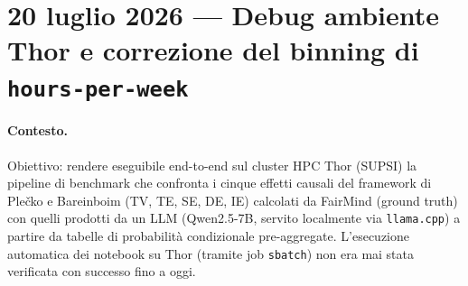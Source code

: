 \section{20 luglio 2026 --- Debug ambiente Thor e correzione del binning di \texttt{hours-per-week}}

\paragraph{Contesto.}
Obiettivo: rendere eseguibile end-to-end sul cluster HPC Thor (SUPSI) la pipeline di benchmark che confronta i cinque effetti causali del framework di Ple\v{c}ko e Bareinboim (TV, TE, SE, DE, IE) calcolati da FairMind (ground truth) con quelli prodotti da un LLM (Qwen2.5-7B, servito localmente via \texttt{llama.cpp}) a partire da tabelle di probabilit\`a condizionale pre-aggregate. L'esecuzione automatica dei notebook su Thor (tramite job \texttt{sbatch}) non era mai stata verificata con successo fino a oggi.

